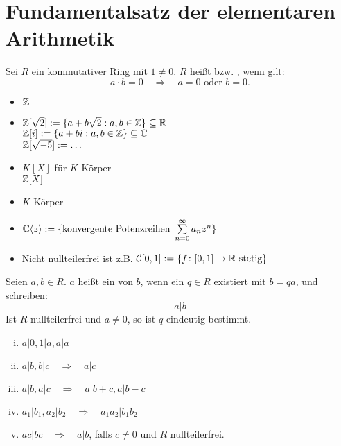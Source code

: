 \section{Fundamentalsatz der elementaren Arithmetik}
\label{sec:para1}

	Sei $R$ ein kommutativer Ring mit $1 \neq 0$. $R$ heißt  bzw. , wenn gilt:  
	\[ a \cdot b = 0 \quad \Rightarrow \quad a = 0 \text{ oder } b = 0.\]

\begin{bsp} \label{bsp_integritaetsringe}
	\begin{itemize}
		\item $\mathbb{Z}$
		\item $\mathbb{Z}[\sqrt{2}] := \{a + b\sqrt{2} : a,b \in \mathbb{Z} \} \subseteq \mathbb{R}$ \\
			$\mathbb{Z}[i] := \{a + bi : a,b \in \mathbb{Z}\} \subseteq \mathbb{C}$ \\
			$\mathbb{Z}[\sqrt{-5}] := \dots$
		\item $K[X]$ für $K$ Körper \\
			$\mathbb{Z}[X]$
		\item $K$ Körper
		\item $\mathbb{C} \langle z\rangle := \{\text{konvergente Potenzreihen } \sum\limits_{n=0}^{\infty} a_n z^n\}$
		\item Nicht nullteilerfrei ist z.B. $\mathcal{C}[0,1] := \{f \colon [0,1] \rightarrow \mathbb{R} \text{ stetig} \}$
	\end{itemize}
\end{bsp}

\begin{defn}[Teilbarkeit] \label{def_1.1}
	Seien $a,b \in R$. $a$ heißt ein  von $b$, wenn ein $q \in R$ existiert mit $b = qa$, und schreiben:
	\[ a | b \]
	Ist $R$ nullteilerfrei und $a \neq 0$, so ist $q$ eindeutig bestimmt.
\end{defn}

\begin{falko} \label{F1.1}
	\begin{enumerate}[(i)]
		\item $a | 0, 1 | a, a | a$
		\item $a | b, b | c \quad \Rightarrow \quad a | c$
		\item $a | b, a | c \quad \Rightarrow \quad a | b+c, a | b-c$
		\item $a_1 | b_1, a_2 | b_2 \quad \Rightarrow \quad a_1 a_2 | b_1 b_2$
		\item $ac | bc \quad \Rightarrow \quad a | b$, falls $c \neq 0$ und $R$ nullteilerfrei.
	\end{enumerate}	
\end{falko}

